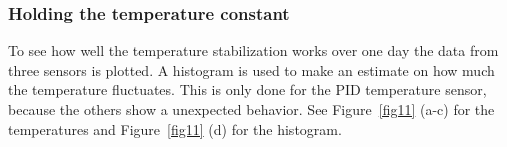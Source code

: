 \documentclass[12pt]{scrartcl}
\begin{document}
      \subsubsection{Holding the temperature constant}
      To see how well the temperature stabilization works over one day the data
      from three sensors is plotted. A histogram is used to make an estimate on
      how much the temperature fluctuates. This is only done for the PID temperature
      sensor, because the others show a unexpected behavior.
      See Figure~\ref{fig11} (a-c) for the temperatures and Figure~\ref{fig11} (d)
      for the histogram.
        \begin{figure}[h!]
          \hspace{-40pt}
          \hspace{-20pt}

\end{figure}
\end{document}
